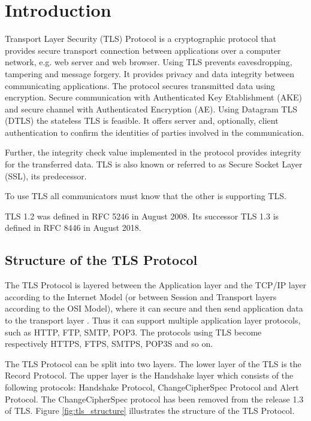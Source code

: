 \chapter{Introduction}
\label{chap:introduction}

Transport Layer Security (TLS) Protocol is a cryptographic protocol that provides secure transport connection between applications over a computer network, e.g. web server and web browser. 
Using TLS prevents eavesdropping, tampering and message forgery. It provides privacy and data integrity between communicating applications. The protocol secures transmitted data using encryption. Secure communication with Authenticated Key Etablishment (AKE) and secure channel with Authenticated Encryption (AE). 
Using Datagram TLS (DTLS) the stateless TLS is feasible. It offers server and, optionally, client authentication to confirm the identities of parties involved in the communication. 
 
Further, the integrity check value implemented in the protocol provides integrity for the transferred data. TLS is also known or referred to as Secure Socket Layer (SSL), its predecessor. 
 
To use TLS all communicators must know that the other is supporting TLS.

TLS 1.2 was defined in RFC 5246 in August 2008. Its successor TLS 1.3 is defined in RFC 8446 in August 2018.
 \cite{RFC5246}

\section{Structure of the TLS Protocol}
\label{sec:stucture}

The TLS Protocol is layered between the Application layer and the TCP/IP layer according to the Internet Model (or between Session and Transport layers according to the OSI Model), where it can secure and then send application data to the transport layer \cite{ms:overview}. Thus it can support multiple application layer protocols, such as HTTP, FTP, SMTP, POP3. The protocols using TLS become respectively HTTPS, FTPS, SMTPS, POP3S and so on.

The TLS Protocol can be split into two layers. The lower layer of the TLS is the Record Protocol. The upper layer is the Handshake layer which consists of the following protocols: Handshake Protocol, ChangeCipherSpec Protocol and Alert Protocol. The ChangeCipherSpec protocol has been removed from the release 1.3 of TLS. Figure \ref{fig:tls_structure} illustrates the structure of the TLS Protocol. 


